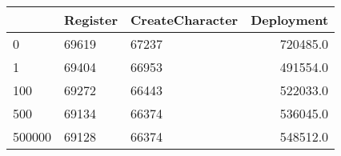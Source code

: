 \begin{tabular}{lllr}
\toprule
{} & Register & CreateCharacter &  Deployment \\
\midrule
0      &    69619 &           67237 &    720485.0 \\
1      &    69404 &           66953 &    491554.0 \\
100    &    69272 &           66443 &    522033.0 \\
500    &    69134 &           66374 &    536045.0 \\
500000 &    69128 &           66374 &    548512.0 \\
\bottomrule
\end{tabular}
